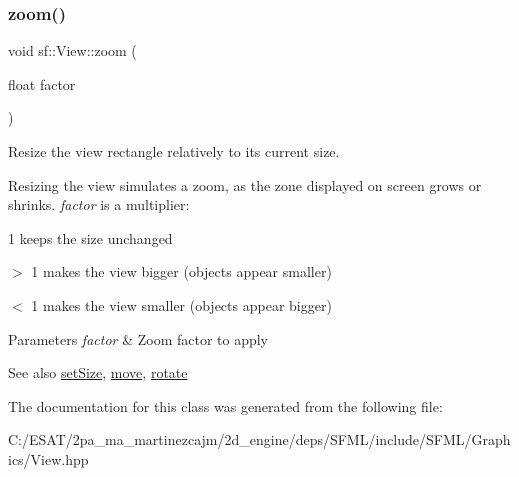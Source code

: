 \subsubsection{\texorpdfstring{zoom()}{zoom()}}
{\footnotesize\ttfamily void sf\+::\+View\+::zoom (\begin{DoxyParamCaption}\item[{float}]{factor }\end{DoxyParamCaption})}



Resize the view rectangle relatively to its current size. 

Resizing the view simulates a zoom, as the zone displayed on screen grows or shrinks. {\itshape factor} is a multiplier\+: \begin{DoxyItemize}
\item 1 keeps the size unchanged \item $>$ 1 makes the view bigger (objects appear smaller) \item $<$ 1 makes the view smaller (objects appear bigger)\end{DoxyItemize}

\begin{DoxyParams}{Parameters}
{\em factor} & Zoom factor to apply\\
\hline
\end{DoxyParams}
\begin{DoxySeeAlso}{See also}
\hyperlink{classsf_1_1_view_a9525b73fe9fbaceb9568faf56b399dab}{set\+Size}, \hyperlink{classsf_1_1_view_a0c82144b837caf812f7cb25a43d80c41}{move}, \hyperlink{classsf_1_1_view_a5fd3901aae1845586ca40add94faa378}{rotate} 
\end{DoxySeeAlso}


The documentation for this class was generated from the following file\+:\begin{DoxyCompactItemize}
\item 
C\+:/\+E\+S\+A\+T/2pa\+\_\+ma\+\_\+martinezcajm/2d\+\_\+engine/deps/\+S\+F\+M\+L/include/\+S\+F\+M\+L/\+Graphics/View.\+hpp\end{DoxyCompactItemize}
